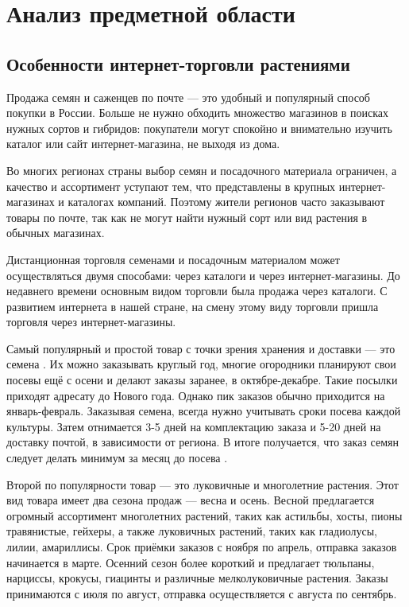\section{Анализ предметной области}
\subsection{Особенности интернет-торговли растениями}

Продажа семян и саженцев по почте — это удобный и популярный способ покупки в России. Больше не нужно обходить множество магазинов в поисках нужных сортов и гибридов: покупатели могут спокойно и внимательно изучить каталог или сайт интернет-магазина, не выходя из дома.

Во многих регионах страны выбор семян и посадочного материала ограничен, а качество и ассортимент уступают тем, что представлены в крупных интернет-магазинах и каталогах компаний. Поэтому жители регионов часто заказывают товары по почте, так как не могут найти нужный сорт или вид растения в обычных магазинах.

Дистанционная торговля семенами и посадочным материалом может осуществляться двумя способами: через каталоги и через интернет-магазины. До недавнего времени основным видом торговли была продажа через каталоги. С развитием интернета в нашей стране, на смену этому виду торговли пришла торговля через интернет-магазины.

Самый популярный и простой товар с точки зрения хранения и доставки — это семена \cite{krivko}. Их можно заказывать круглый год, многие огородники планируют свои посевы ещё с осени и делают заказы заранее, в октябре-декабре. Такие посылки приходят адресату до Нового года. Однако пик заказов обычно приходится на январь-февраль. Заказывая семена, всегда нужно учитывать сроки посева каждой культуры. Затем отнимается 3-5 дней на комплектацию заказа и 5-20 дней на доставку почтой, в зависимости от региона. В итоге получается, что заказ семян следует делать минимум за месяц до посева \cite{kaygorodtseva}.

Второй по популярности товар — это луковичные и многолетние растения. Этот вид товара имеет два сезона продаж — весна и осень. Весной предлагается огромный ассортимент многолетних растений, таких как астильбы, хосты, пионы травянистые, гейхеры, а также луковичных растений, таких как гладиолусы, лилии, амариллисы. Срок приёмки заказов с ноября по апрель, отправка заказов начинается в марте. Осенний сезон более короткий и предлагает тюльпаны, нарциссы, крокусы, гиацинты и различные мелколуковичные растения. Заказы принимаются с июля по август, отправка осуществляется с августа по сентябрь.

